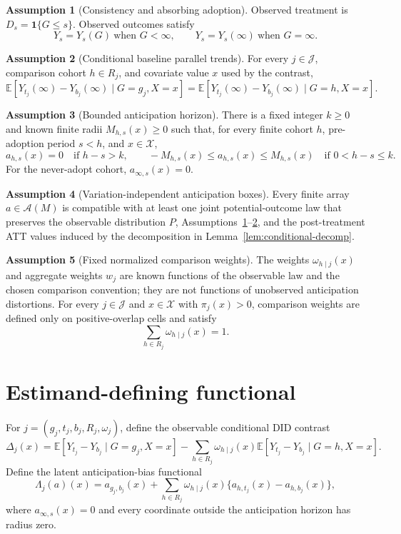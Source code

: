 \documentclass[11pt]{article}
\newcommand{\E}{\mathbb{E}}
\newcommand{\one}{\mathbf{1}}
\theoremstyle{definition}
\newtheorem{assumption}{Assumption}
\theoremstyle{plain}
\theoremstyle{remark}
\begin{document}
\begin{assumption}[Consistency and absorbing adoption]\label{ass:consistency}
Observed treatment is \(D_s=\one\{G\le s\}\).  Observed outcomes satisfy
\[
  Y_s=Y_s(G)\ \text{when }G<\infty,
  \qquad
  Y_s=Y_s(\infty)\ \text{when }G=\infty.
\]
\end{assumption}

\begin{assumption}[Conditional baseline parallel trends]\label{ass:baseline-pt}
For every \(j\in\mathcal{J}\), comparison cohort \(h\in R_j\), and covariate
value \(x\) used by the contrast,
\[
  \E[Y_{t_j}(\infty)-Y_{b_j}(\infty)\mid G=g_j,X=x]
  =
  \E[Y_{t_j}(\infty)-Y_{b_j}(\infty)\mid G=h,X=x].
\]
\end{assumption}

\begin{assumption}[Bounded anticipation horizon]\label{ass:bounded-anticipation}
There is a fixed integer \(k\ge0\) and known finite radii \(M_{h,s}(x)\ge0\) such
that, for every finite cohort \(h\), pre-adoption period \(s<h\), and
\(x\in\mathcal{X}\),
\[
  a_{h,s}(x)=0\quad\text{if }h-s>k,
  \qquad
  -M_{h,s}(x)\le a_{h,s}(x)\le M_{h,s}(x)
  \quad\text{if }0<h-s\le k.
\]
For the never-adopt cohort, \(a_{\infty,s}(x)=0\).
\end{assumption}

\begin{assumption}[Variation-independent anticipation boxes]\label{ass:box-independence}
Every finite array \(a\in\mathcal{A}(M)\) is compatible with at least one joint
potential-outcome law that preserves the observable distribution \(P\),
Assumptions~\ref{ass:consistency}--\ref{ass:baseline-pt}, and the post-treatment
ATT values induced by the decomposition in Lemma~\ref{lem:conditional-decomp}.
\end{assumption}

\begin{assumption}[Fixed normalized comparison weights]\label{ass:fixed-weights}
The weights \(\omega_{h\mid j}(x)\) and aggregate weights \(w_j\) are known
functions of the observable law and the chosen comparison convention; they are not
functions of unobserved anticipation distortions.  For every \(j\in\mathcal{J}\)
and \(x\in\mathcal{X}\) with \(\pi_j(x)>0\), comparison weights are defined only
on positive-overlap cells and satisfy
\[
  \sum_{h\in R_j}\omega_{h\mid j}(x)=1.
\]
\end{assumption}

\section{Estimand-defining functional}
For \(j=(g_j,t_j,b_j,R_j,\omega_j)\), define the observable conditional DID
contrast
\[
  \Delta_j(x)
  =
  \E[Y_{t_j}-Y_{b_j}\mid G=g_j,X=x]
  -
  \sum_{h\in R_j}\omega_{h\mid j}(x)
  \E[Y_{t_j}-Y_{b_j}\mid G=h,X=x].
\]
Define the latent anticipation-bias functional
\[
  \Lambda_j(a)(x)
  =
  a_{g_j,b_j}(x)
  +
  \sum_{h\in R_j}\omega_{h\mid j}(x)
    \{a_{h,t_j}(x)-a_{h,b_j}(x)\},
\]
where \(a_{\infty,s}(x)=0\) and every coordinate outside the anticipation horizon
has radius zero.
\end{document}
